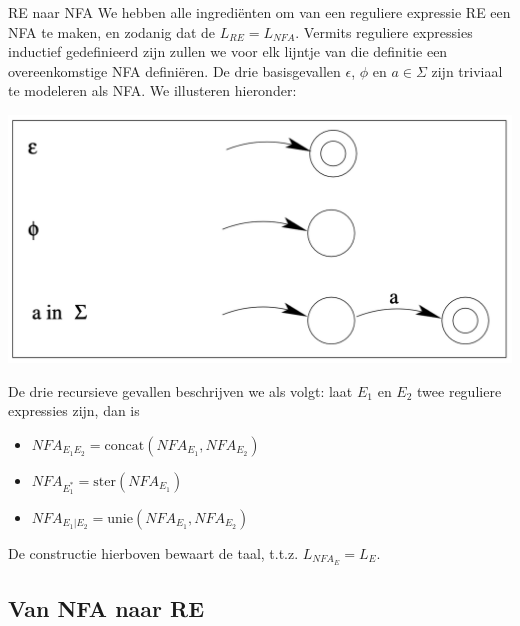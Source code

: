 \begin{theo}[RE $\to$ NFA]{RE naar NFA}
    We hebben alle ingrediënten om van een reguliere expressie RE een NFA te maken, en zodanig dat de $L_{RE} = L_{NFA}$.
    Vermits reguliere expressies inductief gedefinieerd zijn zullen we voor elk lijntje van die definitie een overeenkomstige NFA definiëren.
    De drie basisgevallen $\epsilon$, $\phi$ en $a \in \Sigma$ zijn triviaal te modeleren als NFA.
    We illusteren hieronder:
    \begin{center}
        \includegraphics[scale = 0.275]{Images/NFABasisGevallen.png}
    \end{center}
    De drie recursieve gevallen beschrijven we als volgt: laat $E_{1}$ en $E_{2}$ twee reguliere expressies zijn, dan is
    \begin{itemize}
        \item $NFA_{E_{1}E_{2}} = \text{concat}(NFA_{E_{1}},NFA_{E_{2}})$
        \item $NFA_{E_{1}^{*}} = \text{ster}(NFA_{E_{1}})$
        \item $NFA_{E_{1}|E_{2}} = \text{unie}(NFA_{E_{1}},NFA_{E_{2}})$
    \end{itemize}
    \noindent De constructie hierboven bewaart de taal, t.t.z. $L_{NFA_{E}} = L_{E}$.
\end{theo}

\subsection{Van NFA naar RE}

\vspace{0.5cm}

